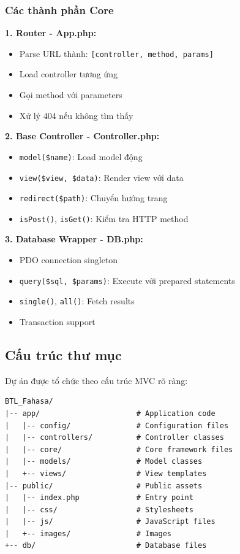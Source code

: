 \subsubsection{Các thành phần Core}

\textbf{1. Router - App.php:}
\begin{itemize}
    \item Parse URL thành: \texttt{[controller, method, params]}
    \item Load controller tương ứng
    \item Gọi method với parameters
    \item Xử lý 404 nếu không tìm thấy
\end{itemize}

\textbf{2. Base Controller - Controller.php:}
\begin{itemize}
    \item \texttt{model(\$name)}: Load model động
    \item \texttt{view(\$view, \$data)}: Render view với data
    \item \texttt{redirect(\$path)}: Chuyển hướng trang
    \item \texttt{isPost()}, \texttt{isGet()}: Kiểm tra HTTP method
\end{itemize}

\textbf{3. Database Wrapper - DB.php:}
\begin{itemize}
    \item PDO connection singleton
    \item \texttt{query(\$sql, \$params)}: Execute với prepared statements
    \item \texttt{single()}, \texttt{all()}: Fetch results
    \item Transaction support
\end{itemize}


\subsection{Cấu trúc thư mục}

Dự án được tổ chức theo cấu trúc MVC rõ ràng:

\begin{verbatim}
BTL_Fahasa/
|-- app/                      # Application code
|   |-- config/               # Configuration files
|   |-- controllers/          # Controller classes
|   |-- core/                 # Core framework files
|   |-- models/               # Model classes
|   +-- views/                # View templates
|-- public/                   # Public assets
|   |-- index.php             # Entry point
|   |-- css/                  # Stylesheets
|   |-- js/                   # JavaScript files
|   +-- images/               # Images
+-- db/                       # Database files
\end{verbatim}


